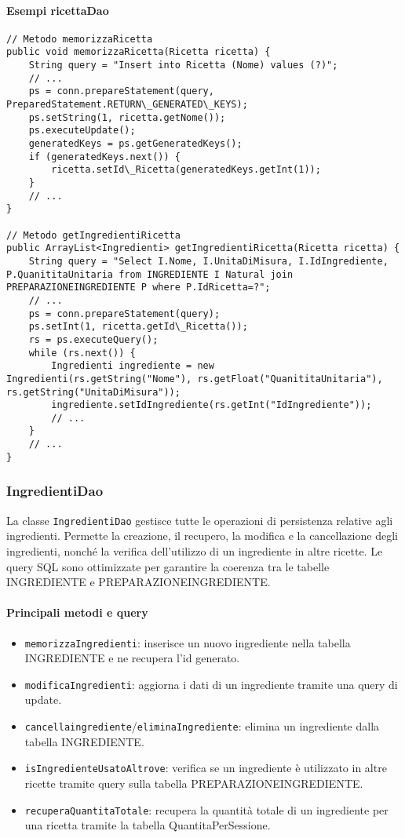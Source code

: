 \paragraph{Esempi ricettaDao}
\begin{verbatim}
// Metodo memorizzaRicetta
public void memorizzaRicetta(Ricetta ricetta) {
    String query = "Insert into Ricetta (Nome) values (?)";
    // ...
    ps = conn.prepareStatement(query, PreparedStatement.RETURN\_GENERATED\_KEYS);
    ps.setString(1, ricetta.getNome());
    ps.executeUpdate();
    generatedKeys = ps.getGeneratedKeys();
    if (generatedKeys.next()) {
        ricetta.setId\_Ricetta(generatedKeys.getInt(1));
    }
    // ...
}

// Metodo getIngredientiRicetta
public ArrayList<Ingredienti> getIngredientiRicetta(Ricetta ricetta) {
    String query = "Select I.Nome, I.UnitaDiMisura, I.IdIngrediente, P.QuanititaUnitaria from INGREDIENTE I Natural join PREPARAZIONEINGREDIENTE P where P.IdRicetta=?";
    // ...
    ps = conn.prepareStatement(query);
    ps.setInt(1, ricetta.getId\_Ricetta());
    rs = ps.executeQuery();
    while (rs.next()) {
        Ingredienti ingrediente = new Ingredienti(rs.getString("Nome"), rs.getFloat("QuanititaUnitaria"), rs.getString("UnitaDiMisura"));
        ingrediente.setIdIngrediente(rs.getInt("IdIngrediente"));
        // ...
    }
    // ...
}
\end{verbatim}

\subsubsection{IngredientiDao}
La classe \texttt{IngredientiDao} gestisce tutte le operazioni di persistenza relative agli ingredienti. Permette la creazione, il recupero, la modifica e la cancellazione degli ingredienti, nonché la verifica dell'utilizzo di un ingrediente in altre ricette. Le query SQL sono ottimizzate per garantire la coerenza tra le tabelle INGREDIENTE e PREPARAZIONEINGREDIENTE.

\paragraph{Principali metodi e query}
\begin{itemize}
    \item \texttt{memorizzaIngredienti}: inserisce un nuovo ingrediente nella tabella INGREDIENTE e ne recupera l'id generato.
    \item \texttt{modificaIngredienti}: aggiorna i dati di un ingrediente tramite una query di update.
    \item \texttt{cancellaingrediente}/\texttt{eliminaIngrediente}: elimina un ingrediente dalla tabella INGREDIENTE.
    \item \texttt{isIngredienteUsatoAltrove}: verifica se un ingrediente è utilizzato in altre ricette tramite query sulla tabella PREPARAZIONEINGREDIENTE.
    \item \texttt{recuperaQuantitaTotale}: recupera la quantità totale di un ingrediente per una ricetta tramite la tabella QuantitaPerSessione.
\end{itemize}


